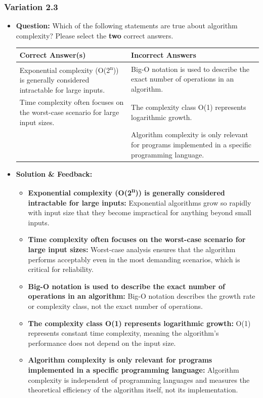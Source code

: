 \subsubsection{Variation 2.3}
\begin{itemize}
    \item \textbf{Question:} Which of the following statements are true about algorithm complexity? Please select the \textbf{two} correct answers.
    
    \begin{tabularx}{\textwidth}{|X|X|}
        \hline
        \textbf{Correct Answer(s)} & \textbf{Incorrect Answers} \\
        \hline
        Exponential complexity (O(2\textsuperscript{n})) is generally considered intractable for large inputs. & Big-O notation is used to describe the exact number of operations in an algorithm. \\
        Time complexity often focuses on the worst-case scenario for large input sizes. & The complexity class O(1) represents logarithmic growth. \\
         & Algorithm complexity is only relevant for programs implemented in a specific programming language. \\
        \hline
    \end{tabularx}
    
    \item \textbf{Solution \& Feedback:}
    \begin{itemize}
        \item \textbf{Exponential complexity (O(2\textsuperscript{n})) is generally considered intractable for large inputs:} Exponential algorithms grow so rapidly with input size that they become impractical for anything beyond small inputs.
        \item \textbf{Time complexity often focuses on the worst-case scenario for large input sizes:} Worst-case analysis ensures that the algorithm performs acceptably even in the most demanding scenarios, which is critical for reliability.
        \item \textbf{Big-O notation is used to describe the exact number of operations in an algorithm:} Big-O notation describes the growth rate or complexity class, not the exact number of operations.
        \item \textbf{The complexity class O(1) represents logarithmic growth:} O(1) represents constant time complexity, meaning the algorithm's performance does not depend on the input size.
        \item \textbf{Algorithm complexity is only relevant for programs implemented in a specific programming language:} Algorithm complexity is independent of programming languages and measures the theoretical efficiency of the algorithm itself, not its implementation.
    \end{itemize}
\end{itemize}

